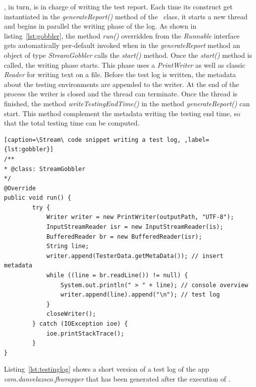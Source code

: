 \Stream, in turn, is in charge of writing the test report. Each time its construct get instantiated in the \textit{generateReport()} method of the \Cmd\ class, it starts a new thread and begins in parallel the writing phase of the log. 
As shown in listing~\ref{lst:gobbler}, the method \textit{run()} overridden from the \textit{Runnable} interface gets automatically per-default invoked when in the \textit{generateReport} method an object of type \textit{StreamGobbler} calls the \textit{start()} method. 
Once the \textit{start()} method is called, the writing phase starts. This phase uses a \textit{PrintWriter} as well as classic \textit{Reader} for writing text on a file.
Before the test log is written, the metadata about the testing environments are appended to the writer. At the end of the process the writer is closed and the thread can terminate. Once the thread is finished, the method \textit{writeTestingEndTime()} in the method \textit{generateReport()} can start. This method complement the metadata writing the testing end time, so that the total testing time can be computed. 





\begin{lstlisting}[caption=\Stream\ code snippet writing a test log, ,label={lst:gobbler}]
/**
* @class: StreamGobbler
*/
@Override
public void run() {
        try {
            Writer writer = new PrintWriter(outputPath, "UTF-8");
            InputStreamReader isr = new InputStreamReader(is);
            BufferedReader br = new BufferedReader(isr);
            String line;
            writer.append(TesterData.getMetaData()); // insert metadata
            while ((line = br.readLine()) != null) {
                System.out.println(" > " + line); // console overview
                writer.append(line).append("\n"); // test log 
            }
            closeWriter();
        } catch (IOException ioe) {
            ioe.printStackTrace();
        }
}
\end{lstlisting}

Listing~\ref{lst:testinglog} shows a short version of a test log of the app \textit{com.danvelazsco.fbwrapper} that has been generated after the execution of \monkey. 

